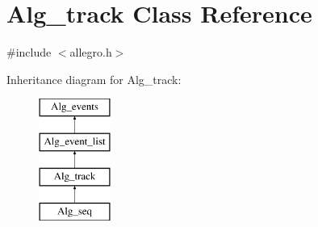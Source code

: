 \hypertarget{class_alg__track}{}\section{Alg\+\_\+track Class Reference}
\label{class_alg__track}


{\ttfamily \#include $<$allegro.\+h$>$}

Inheritance diagram for Alg\+\_\+track\+:\begin{figure}[H]
\begin{center}
\leavevmode
\includegraphics[height=4.000000cm]{class_alg__track}
\end{center}
\end{figure}
